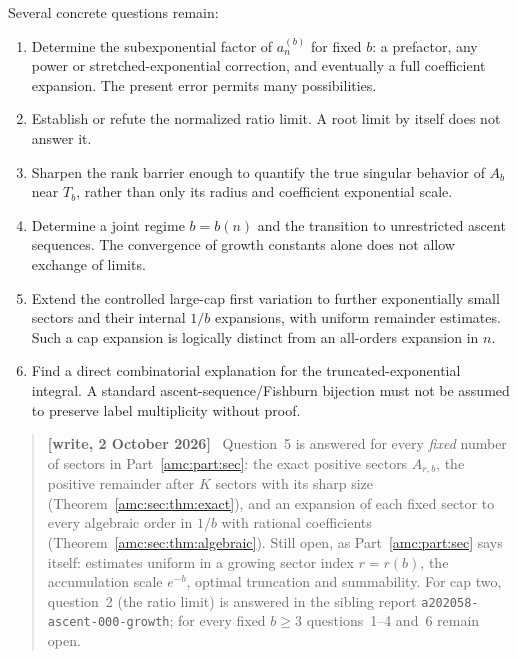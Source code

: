 \documentclass[11pt,letterpaper]{article}
\theoremstyle{remark}\newtheorem{remark}[theorem]{Remark}
\newenvironment{writenote}{\par\smallskip\begin{quote}\small\textbf{[write, 2 October 2026]}\ }{\end{quote}\smallskip}
\newcommand{\repopath}[1]{\nolinkurl{#1}}
\begin{document}
Several concrete questions remain:
\begin{enumerate}
\item Determine the subexponential factor of $a_n^{(b)}$ for fixed $b$: a prefactor, any power or stretched-exponential correction, and eventually a full coefficient expansion. The present error permits many possibilities.
\item Establish or refute the normalized ratio limit. A root limit by itself does not answer it.
\item Sharpen the rank barrier enough to quantify the true singular behavior of $A_b$ near $T_b$, rather than only its radius and coefficient exponential scale.
\item Determine a joint regime $b=b(n)$ and the transition to unrestricted ascent sequences. The convergence of growth constants alone does not allow exchange of limits.
\item Extend the controlled large-cap first variation to further exponentially small sectors and their internal $1/b$ expansions, with uniform remainder estimates. Such a cap expansion is logically distinct from an all-orders expansion in $n$.
\item Find a direct combinatorial explanation for the truncated-exponential integral. A standard ascent-sequence/Fishburn bijection must not be assumed to preserve label multiplicity without proof.
\end{enumerate}
\begin{writenote}
Question~5 is answered for every \emph{fixed} number of sectors in Part~\ref{amc:part:sec}: the exact positive sectors $A_{r,b}$, the positive remainder after $K$ sectors with its sharp size (Theorem~\ref{amc:sec:thm:exact}), and an expansion of each fixed sector to every algebraic order in $1/b$ with rational coefficients (Theorem~\ref{amc:sec:thm:algebraic}). Still open, as Part~\ref{amc:part:sec} says itself: estimates uniform in a growing sector index $r=r(b)$, the accumulation scale $e^{-b}$, optimal truncation and summability. For cap two, question~2 (the ratio limit) is answered in the sibling report \repopath{a202058-ascent-000-growth}; for every fixed $b\ge3$ questions~1--4 and~6 remain open.
\end{writenote}
\end{document}
